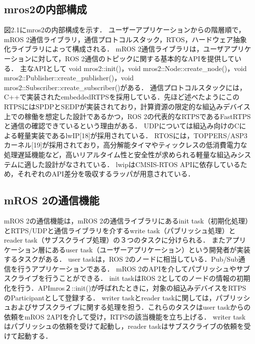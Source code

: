 \subsection{mros2の内部構成}
図2.1にmros2の内部構成を示す．
ユーザーアプリケーションからの階層順で，mROS 2通信ライブラリ，通信プロトコルスタック，RTOS，ハードウェア抽象化ライブラリによって構成される．
mROS 2通信ライブラリは，ユーザアプリケーションに対して，ROS 2通信のトピックに関する基本的なAPIを提供している．
主なAPIとして void mros2::init()，void mros2::Node::create\_node()，void mros2::Publisher::create\_publisher()，void mros2::Subscriber::create\_subscriber()がある．
通信プロトコルスタックには，C++で実装されたembeddedRTPSを採用している．先ほど述べたようにこのRTPSにはSPDPとSEDPが実装されており，計算資源の限定的な組込みデバイス上での稼働を想定した設計であるかつ，ROS 2の代表的なRTPSであるFastRTPSと通信の確認できているという理由がある．
UDPについては組込み向けのCによる軽量実装であるlwIP[18]が採用されている．
RTOSには，TOPPERS/ASP3カーネル[19]が採用されており，高分解能タイマやティックレスの低消費電力な処理遅延機能など，高いリアルタイム性と安全性が求められる軽量な組込みシステムに適した設計がなされている．
lwipはCMSIS-RTOS APIに依存しているため，それぞれのAPI差分を吸収するラッパが用意されている．
\subsection{mROS 2の通信機能}
mROS 2の通信機能は，mROS 2の通信ライブラリにあるinit task（初期化処理）とRTPS/UDPと通信ライブラリを介するwrite task（パブリッシュ処理）とreader task（サブスクライブ処理）の３つのタスクに分けられる．
またアプリケーション層にあるuser task（ユーザーアプリケーション）という開発者が実装するタスクがある．
user taskは，ROS 2のノードに相当している．Pub/Sub通信を行うアプリケーションである．
mROS 2のAPIを介してパブリッシュやサブスクライブを行うことができる．
init taskはROS 2としてのノードの情報の初期化を行う．APImros２::init()が呼ばれたときに，対象の組込みデバイスをRTPSのParticipantとして登録する．
writer taskとreader taskに関しては，パブリッシュおよびサブスクライブに関する処理を担う．これらのタスクはuser taskからの依頼をmROS 2APIを介して受け，RTPSの該当機能を立ち上げる．
writer taskはパブリッシュの依頼を受けて起動し，reader taskはサブスクライブの依頼を受けて起動する．

